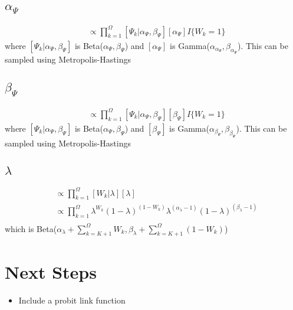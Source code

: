 \documentclass[fleqn]{article}
\begin{document}
\subsection{$\alpha_\Psi$}
%
\begin{align*}
  [\alpha_\Psi | \cdot] & \propto \prod_{k = 1}^\Omega [\Psi_k | \alpha_\Psi, \beta_\Psi] [\alpha_\Psi] I\{W_k = 1\}
\end{align*}
where $[\Psi_k | \alpha_\Psi, \beta_\Psi]$ is Beta($\alpha_\Psi, \beta_\Psi$) and $[\alpha_\Psi]$ is Gamma($\alpha_{\alpha_\Psi}, \beta_{\alpha_\Psi}$). This can be sampled using Metropolis-Hastings
%
\subsection{$\beta_\Psi$}
%
\begin{align*}
  [\beta_\Psi | \cdot] & \propto \prod_{k = 1}^\Omega [\Psi_k | \alpha_\Psi, \beta_\Psi] [\beta_\Psi] I\{W_k = 1\}
\end{align*}
where $[\Psi_k | \alpha_\Psi, \beta_\Psi]$ is Beta($\alpha_\Psi, \beta_\Psi$) and $[\beta_\Psi]$ is Gamma($\alpha_{\beta_\Psi}, \beta_{\beta_\Psi}$). This can be sampled using Metropolis-Hastings
%
\subsection{$\lambda$}
%
\begin{align*}
  [\lambda | \cdot ] & \propto \prod_{k = 1}^\Omega [W_k | \lambda] [\lambda]\\
  & \propto  \prod_{k = 1}^\Omega \lambda^{W_k} (1 - \lambda)^{(1 - W_k)} \lambda^{(\alpha_\lambda - 1)} (1 - \lambda)^{(\beta_\lambda - 1)}\\
\end{align*}
%
which is Beta($\alpha_\lambda + \sum_{k = K + 1}^\Omega W_k, \beta_\lambda + \sum_{k = K + 1}^\Omega (1 - W_k)$)
%
\section{Next Steps}
\begin{itemize}
  \item Include a probit link function
\end{itemize}
\end{document}

